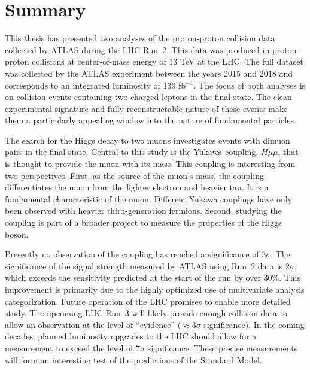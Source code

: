 \chapter{Summary}\label{sec:summary}

This thesis has presented two analyses of the proton-proton collision data collected by ATLAS during the LHC Run~2.
This data was produced in proton-proton collisions at center-of-mass energy of 13 TeV at the LHC.
The full dataset was collected by the ATLAS experiment between the years 2015 and 2018 and corresponds to an integrated luminosity of 139 fb$^{-1}$.
The focus of both analyses is on collision events containing two charged leptons in the final state.
The clean experimental signature and fully reconstructable nature of these events make them a particularly appealing window into the nature of fundamental particles.


The search for the Higgs decay to two muons investigates events with dimuon pairs in the final state.
Central to this study is the Yukawa coupling, $H\mu\mu$, that is thought to provide the muon with its mass.
This coupling is interesting from two perspectives.
First, as the source of the muon's mass, the coupling differentiates the muon from the lighter electron and heavier tau.
It is a fundamental characteristic of the muon.
Different Yukawa couplings have only been observed with heavier third-generation fermions.
Second, studying the coupling is part of a broader project to measure the properties of the Higgs boson.

Presently no observation of the coupling has reached a significance of $3\sigma$.
The significance of the \hmm signal strength measured by ATLAS using Run~2 data is 2$\sigma$, which exceeds the sensitivity predicted at the start of the run by over 30\%. 
This improvement is primarily due to the highly optimized use of multivariate analysis categorization.
Future operation of the LHC promises to enable more detailed study.
The upcoming LHC Run~3 will likely provide enough collision data to allow an observation at the level of ``evidence'' ($\approx3\sigma$ significance).
In the coming decades, planned luminosity upgrades to the LHC should allow for a measurement to exceed the level of $7\sigma$ significance.
These precise measurements will form an interesting test of the predictions of the Standard Model.

